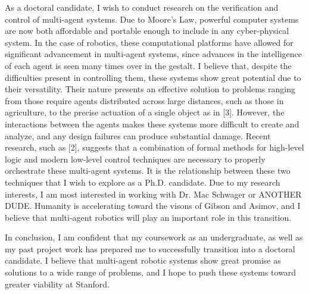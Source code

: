 \documentclass[]{article}
\begin{document}
As a doctoral candidate, I wish to conduct research on the verification and control of multi-agent systems. Due to Moore’s Law, powerful computer systems are now both affordable and portable enough to include in any cyber-physical system. In the case of robotics, these computational platforms have allowed for significant advancement in multi-agent systems, since advances in the intelligence of each agent is seen many times over in the gestalt. I believe that, despite the difficulties present in controlling them, these systems show great potential due to their versatility. Their nature presents an effective solution to problems ranging from those require agents distributed across large distances, such as those in agriculture, to the precise actuation of a single object as in [3]. However, the interactions between the agents makes these systems more difficult to create and analyze, and any design failures can produce substantial damage. Recent research, such as [2], suggests that a combination of formal methods for high-level logic and modern low-level control techniques are necessary to properly orchestrate these multi-agent systems. It is the relationship between these two techniques that I wish to explore as a Ph.D. candidate. Due to my research interests, I am most interested in working with Dr. Mac Schwager or ANOTHER DUDE. Humanity is accelerating toward the visons of Gibson and Asimov, and I believe that multi-agent robotics will play an important role in this transition.

In conclusion, I am confident that my coursework as an undergraduate, as well as my past project work has prepared me to successfully transition into a doctoral candidate. I believe that multi-agent robotic systems show great promise as solutions to a wide range of problems, and I hope to push these systems toward greater viability at Stanford.
\end{document}
